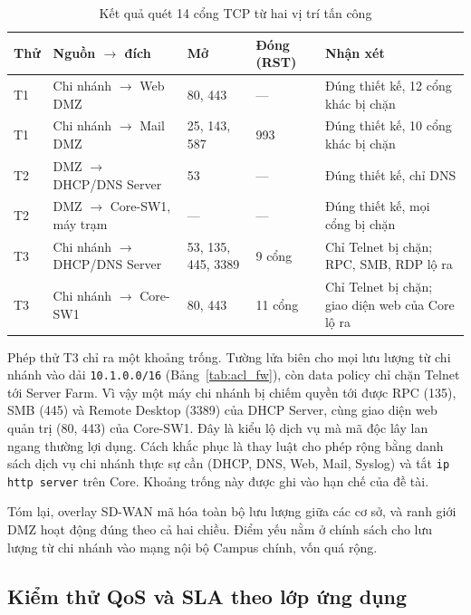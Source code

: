 \begin{table}[H]
    \centering
    \small
    \caption{Kết quả quét 14 cổng TCP từ hai vị trí tấn công}
    \label{tab:quet_cong}
    \begin{tabularx}{\textwidth}{|P{0.8cm}|L{3.8cm}|L{2.6cm}|L{2.2cm}|Y|}
        \hline
        \textbf{Thử} & \textbf{Nguồn $\rightarrow$ đích} & \textbf{Mở} & \textbf{Đóng (RST)} & \textbf{Nhận xét} \\
        \hline
        T1 & Chi nhánh $\rightarrow$ Web DMZ & 80, 443 & --- & Đúng thiết kế, 12 cổng khác bị chặn \\
        \hline
        T1 & Chi nhánh $\rightarrow$ Mail DMZ & 25, 143, 587 & 993 & Đúng thiết kế, 10 cổng khác bị chặn \\
        \hline
        T2 & DMZ $\rightarrow$ DHCP/DNS Server & 53 & --- & Đúng thiết kế, chỉ DNS \\
        \hline
        T2 & DMZ $\rightarrow$ Core-SW1, máy trạm & --- & --- & Đúng thiết kế, mọi cổng bị chặn \\
        \hline
        T3 & Chi nhánh $\rightarrow$ DHCP/DNS Server & 53, 135, 445, 3389 & 9 cổng & Chỉ Telnet bị chặn; RPC, SMB, RDP lộ ra \\
        \hline
        T3 & Chi nhánh $\rightarrow$ Core-SW1 & 80, 443 & 11 cổng & Chỉ Telnet bị chặn; giao diện web của Core lộ ra \\
        \hline
    \end{tabularx}
\end{table}

Phép thử T3 chỉ ra một khoảng trống. Tường lửa biên cho mọi lưu lượng từ chi nhánh vào dải \texttt{10.1.0.0/16} (Bảng~\ref{tab:acl_fw}), còn data policy chỉ chặn Telnet tới Server Farm. Vì vậy một máy chi nhánh bị chiếm quyền tới được RPC (135), SMB (445) và Remote Desktop (3389) của DHCP Server, cùng giao diện web quản trị (80, 443) của Core-SW1. Đây là kiểu lộ dịch vụ mà mã độc lây lan ngang thường lợi dụng. Cách khắc phục là thay luật cho phép rộng bằng danh sách dịch vụ chi nhánh thực sự cần (DHCP, DNS, Web, Mail, Syslog) và tắt \texttt{ip http server} trên Core. Khoảng trống này được ghi vào hạn chế của đề tài.

Tóm lại, overlay SD-WAN mã hóa toàn bộ lưu lượng giữa các cơ sở, và ranh giới DMZ hoạt động đúng theo cả hai chiều. Điểm yếu nằm ở chính sách cho lưu lượng từ chi nhánh vào mạng nội bộ Campus chính, vốn quá rộng.

\subsection{Kiểm thử QoS và SLA theo lớp ứng dụng}\label{sec:kiem_thu_qos}

